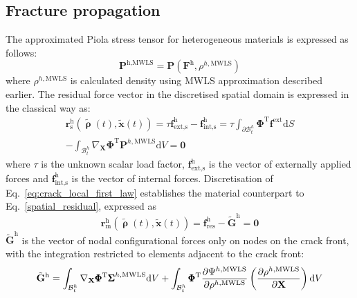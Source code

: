 \documentclass[onecolumn]{svjour3}
\begin{document}
\subsection{Fracture propagation} \label{sec:fem_fracture_prop}
% 
The approximated Piola stress tensor for heterogeneous materials is expressed as follows:
\begin{equation}
	\mathbf{P}^{\textrm{h},\textrm{MWLS}} = 
		\mathbf{P}(
		\mathbf{F}^\textrm{h}, \rho^{h,\textrm{MWLS}})
\end{equation}
where $\rho^{h,\textrm{MWLS}}$ is calculated density using MWLS approximation described earlier.
The residual force vector in the discretised spatial domain is expressed in the classical way as:
\begin{equation}
\begin{aligned}
\label{spatial_residual}
	\mathbf{r}_\textrm{s}^\textrm{h}(\tilde{\pmb\uprho}(t), \tilde{\mathbf{x}}(t)) = \tau\mathbf{f}^\textrm{h}_\textrm{ext,s}-\mathbf{f}^\textrm{h}_\textrm{int,s}= 
	\tau \int_{\partial\mathcal{B}^h_t} \pmb{\Phi}^\textrm{T}
	\mathbf{f}^\textrm{ext}
	\textrm{d}S\\
	- \int_{\mathcal{B}^h_t} \nabla_\mathbf{X} \pmb{\Phi}^\textrm{T}
	\mathbf{P}^{h,\textrm{MWLS}}\textrm{d}V=\mathbf{0}
	\end{aligned}
\end{equation}
where $\tau$ is the unknown scalar load factor, $\mathbf{f}^\textrm{h}_\textrm{ext,s}$ is the vector of externally applied forces and $\mathbf{f}^\textrm{h}_\textrm{int,s}$ is the vector of internal forces. 
% 
Discretisation of Eq.~\ref{eq:crack_local_first_law} establishes the material counterpart to Eq.~\ref{spatial_residual}, expressed as
\begin{equation}
\label{material_residual}
\mathbf{r}_\textrm{m}^\textrm{h}(\tilde{\pmb\uprho}(t), \tilde{\mathbf{x}}(t)) = \mathbf{f}^\textrm{h}_\textrm{res}-\tilde{\mathbf{G}}^\textrm{h}=\mathbf{0}
\end{equation}
$\tilde{\mathbf{G}}^\textrm{h}$ is the vector of nodal configurational forces only on nodes on the crack front, with the integration restricted to elements adjacent to the crack front:
\begin{equation}
\begin{aligned}
	\tilde{\mathbf{G}}^\textrm{h} =
	\int_{\mathcal{B}^h_t}
		\nabla_\mathbf{X}\pmb{\Phi}^\textrm{T} {\pmb\Sigma}^{h,\textrm{MWLS}}
	\textrm{d}V 
	+
	\int_{\mathcal{B}^h_t}
		\pmb{\Phi}^\textrm{T} \dfrac{\partial {\Psi}^{h,\textrm{MWLS}} }{\partial \rho^{h,\rm{MWLS}}}
		\left(
			\frac{\partial 
			\rho^{h,\textrm{MWLS}}}{\partial \mathbf{X}}
		\right)
	\textrm{d}V
	\label{eq:mat_int_front}
	\end{aligned}
\end{equation}
\end{document}
